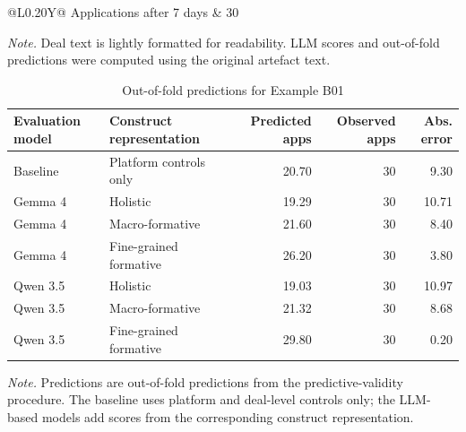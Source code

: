 \begin{table}[p]
\begin{tabularx}{\textwidth}{@{}L{0.20\textwidth}Y@{}}
\addlinespace[0.5em]
Applications after 7 days
&
30
\\

\bottomrule
\end{tabularx}

\begin{flushleft}
\footnotesize
\textit{Note.} Deal text is lightly formatted for readability. LLM scores and out-of-fold predictions were computed using the original artefact text.
\end{flushleft}
\end{table}


\begin{table}[htbp]
\centering
\small
\caption{Out-of-fold predictions for Example B01}
\label{tab:barter_example_b01_predictions}
\begin{tabular}{@{}llrrr@{}}
\toprule
Evaluation model & Construct representation & Predicted apps & Observed apps & Abs. error \\
\midrule
Baseline & Platform controls only & 20.70 & 30 & 9.30 \\
\addlinespace
Gemma 4 & Holistic & 19.29 & 30 & 10.71 \\
Gemma 4 & Macro-formative & 21.60 & 30 & 8.40 \\
Gemma 4 & Fine-grained formative & 26.20 & 30 & 3.80 \\
\addlinespace
Qwen 3.5 & Holistic & 19.03 & 30 & 10.97 \\
Qwen 3.5 & Macro-formative & 21.32 & 30 & 8.68 \\
Qwen 3.5 & Fine-grained formative & 29.80 & 30 & 0.20 \\
\bottomrule
\end{tabular}

\begin{flushleft}
\footnotesize
\textit{Note.} Predictions are out-of-fold predictions from the predictive-validity procedure. The baseline uses platform and deal-level controls only; the LLM-based models add scores from the corresponding construct representation.
\end{flushleft}
\end{table}




